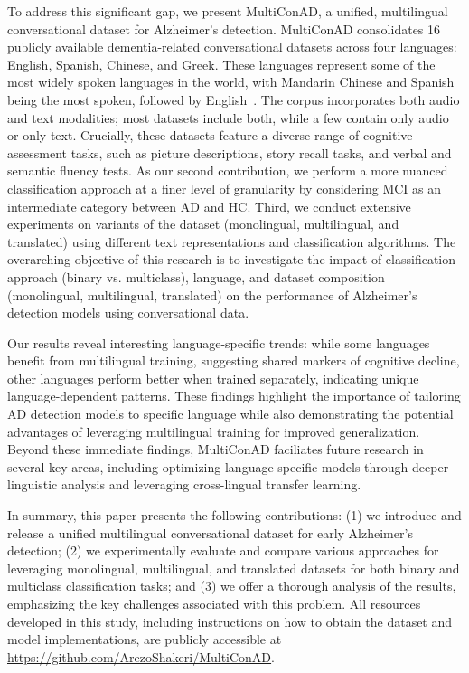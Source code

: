 To address this significant gap, we present MultiConAD, a unified, multilingual conversational dataset for Alzheimer's detection. MultiConAD consolidates 16 publicly available dementia-related conversational datasets across four languages: English, Spanish, Chinese, and Greek. These languages represent some of the most widely spoken languages in the world, with Mandarin Chinese and Spanish being the most spoken, followed by English~\cite{shakeri2025natural}. The corpus incorporates both audio and text modalities; most datasets include both, while a few contain only audio or only text. Crucially, these datasets feature a diverse range of cognitive assessment tasks, such as picture descriptions, story recall tasks, and verbal and semantic fluency tests.
As our second contribution, we perform a more nuanced classification approach at a finer level of granularity by considering MCI as an intermediate category between AD and HC. Third, we conduct extensive experiments on variants of the dataset (monolingual, multilingual, and translated) using different text representations and classification algorithms. The overarching objective of this research is to investigate the impact of classification approach (binary vs. multiclass), language, and dataset composition (monolingual, multilingual, translated) on the performance of Alzheimer's detection models using conversational data.



Our results reveal interesting language-specific trends: while some languages benefit from multilingual training, suggesting shared markers of cognitive decline, other languages perform better when trained separately, indicating unique language-dependent patterns. 
These findings highlight the importance of tailoring AD detection models to specific language while also demonstrating the potential advantages of leveraging multilingual training for improved generalization. 
Beyond these immediate findings, MultiConAD faciliates future research in several key areas, including optimizing language-specific models through deeper linguistic analysis and leveraging cross-lingual transfer learning.

In summary, this paper presents the following contributions: (1) we introduce and release a unified multilingual conversational dataset for early Alzheimer’s detection; (2) we experimentally evaluate and compare various approaches for leveraging monolingual, multilingual, and translated datasets for both binary and multiclass classification tasks; and (3) we offer a thorough analysis of the results, emphasizing the key challenges associated with this problem. All resources developed in this study, including instructions on how to obtain the dataset and model implementations, are publicly accessible at \url{https://github.com/ArezoShakeri/MultiConAD}.










